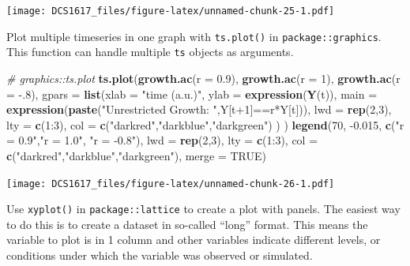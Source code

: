 \documentclass[]{book}
\newenvironment{Shaded}{\begin{snugshade}}{\end{snugshade}}
\newcommand{\KeywordTok}[1]{\textcolor[rgb]{0.13,0.29,0.53}{\textbf{{#1}}}}
\newcommand{\DataTypeTok}[1]{\textcolor[rgb]{0.13,0.29,0.53}{{#1}}}
\newcommand{\DecValTok}[1]{\textcolor[rgb]{0.00,0.00,0.81}{{#1}}}
\newcommand{\FloatTok}[1]{\textcolor[rgb]{0.00,0.00,0.81}{{#1}}}
\newcommand{\StringTok}[1]{\textcolor[rgb]{0.31,0.60,0.02}{{#1}}}
\newcommand{\CommentTok}[1]{\textcolor[rgb]{0.56,0.35,0.01}{\textit{{#1}}}}
\newcommand{\OtherTok}[1]{\textcolor[rgb]{0.56,0.35,0.01}{{#1}}}
\newcommand{\NormalTok}[1]{{#1}}
\begin{document}
\texttt{[image: DCS1617\_files/figure-latex/unnamed-chunk-25-1.pdf]}

Plot multiple timeseries in one graph with \texttt{ts.plot()} in
\texttt{package::graphics}. This function can handle multiple
\texttt{ts} objects as arguments.

\begin{Shaded}
\begin{Highlighting}[]
\CommentTok{# graphics::ts.plot}
\KeywordTok{ts.plot}\NormalTok{(}\KeywordTok{growth.ac}\NormalTok{(}\DataTypeTok{r =} \FloatTok{0.9}\NormalTok{), }
        \KeywordTok{growth.ac}\NormalTok{(}\DataTypeTok{r =} \DecValTok{1}\NormalTok{), }
        \KeywordTok{growth.ac}\NormalTok{(}\DataTypeTok{r =} \NormalTok{-.}\DecValTok{8}\NormalTok{), }
        \DataTypeTok{gpars =} \KeywordTok{list}\NormalTok{(}\DataTypeTok{xlab =} \StringTok{"time (a.u.)"}\NormalTok{,}
                     \DataTypeTok{ylab =} \KeywordTok{expression}\NormalTok{(}\KeywordTok{Y}\NormalTok{(t)),}
                     \DataTypeTok{main =} \KeywordTok{expression}\NormalTok{(}\KeywordTok{paste}\NormalTok{(}\StringTok{"Unrestricted Growth: "}\NormalTok{,Y[t}\DecValTok{+1}\NormalTok{]==r*Y[t])),}
                     \DataTypeTok{lwd =} \KeywordTok{rep}\NormalTok{(}\DecValTok{2}\NormalTok{,}\DecValTok{3}\NormalTok{),}
                     \DataTypeTok{lty =} \KeywordTok{c}\NormalTok{(}\DecValTok{1}\NormalTok{:}\DecValTok{3}\NormalTok{),}
                     \DataTypeTok{col =} \KeywordTok{c}\NormalTok{(}\StringTok{"darkred"}\NormalTok{,}\StringTok{"darkblue"}\NormalTok{,}\StringTok{"darkgreen"}\NormalTok{)}
                     \NormalTok{)}
        \NormalTok{)}
\KeywordTok{legend}\NormalTok{(}\DecValTok{70}\NormalTok{, -}\FloatTok{0.015}\NormalTok{, }\KeywordTok{c}\NormalTok{(}\StringTok{"r = 0.9"}\NormalTok{,}\StringTok{"r = 1.0"}\NormalTok{, }\StringTok{"r = -0.8"}\NormalTok{), }\DataTypeTok{lwd =} \KeywordTok{rep}\NormalTok{(}\DecValTok{2}\NormalTok{,}\DecValTok{3}\NormalTok{), }\DataTypeTok{lty =} \KeywordTok{c}\NormalTok{(}\DecValTok{1}\NormalTok{:}\DecValTok{3}\NormalTok{), }\DataTypeTok{col =} \KeywordTok{c}\NormalTok{(}\StringTok{"darkred"}\NormalTok{,}\StringTok{"darkblue"}\NormalTok{,}\StringTok{"darkgreen"}\NormalTok{), }\DataTypeTok{merge =} \OtherTok{TRUE}\NormalTok{)}
\end{Highlighting}
\end{Shaded}

\texttt{[image: DCS1617\_files/figure-latex/unnamed-chunk-26-1.pdf]}

Use \texttt{xyplot()} in \texttt{package::lattice} to create a plot with
panels. The easiest way to do this is to create a dataset in so-called
``long'' format. This means the variable to plot is in 1 column and
other variables indicate different levels, or conditions under which the
variable was observed or simulated.
\end{document}
